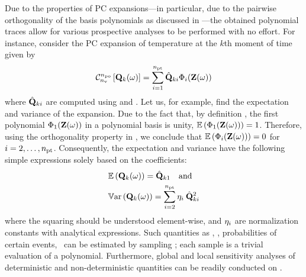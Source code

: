 Due to the properties of PC expansions---in particular, due to the pairwise orthogonality of the basis polynomials as discussed in ---the obtained polynomial traces allow for various prospective analyses to be performed with no effort. For instance, consider the PC expansion of temperature at the $k$th moment of time given by
\begin{equation} \elabel{pc-k}
  \oPC{\nvars}{\pcorder}{\vTO_k(\o)} = \sum_{i = 1}^{\pcterms} \pcc{\vTO}_{ki} \pcb_i(\vZ(\o))
\end{equation}
where $\hat{\mathbf{Q}}_{ki}$ are computed using  and . Let us, for example, find the expectation and variance of the expansion.
Due to the fact that, by definition \cite{xiu2010}, the first polynomial $\Phi_1(\mathbf{Z}(\omega))$ in a polynomial basis is unity, $\mathbb{E}\left(\Phi_1(\mathbf{Z}(\omega))\right) = 1$.
Therefore, using the orthogonality property in , we conclude that $\mathbb{E}\left(\Phi_i(\mathbf{Z}(\omega))\right) = 0$ for $i = 2, \dotsc, {n_\text{pt}}$.
Consequently, the expectation and variance have the following simple expressions solely based on the coefficients:
\begin{equation} \elabel{pc-moments}
\begin{aligned}
  & \oExp{\vTO_k(\o)} = \pcc{\vTO}_{k1} \hspace{1em} \text{and} \\
  & \oVar{\vTO_k(\o)} = \sum_{i = 2}^{\pcterms} \pcn_i \: \pcc{\vTO}_{ki}^2
\end{aligned}
\end{equation}
where the squaring should be understood element-wise, and $\eta_i$ are normalization constants with analytical expressions. Such quantities as \cdfs, \pdfs, probabilities of certain events, \etc\ can be estimated by sampling ; each sample is a trivial evaluation of a polynomial. Furthermore, global and local sensitivity analyses of deterministic and non-deterministic quantities can be readily conducted on .
